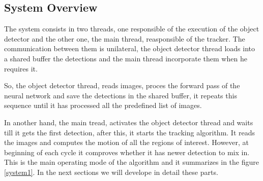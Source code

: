 \documentclass[12pt, a4paper, titlepage,twoside,openright]{article}
\begin{document}
\subsection{System Overview}


The system consists in two threads, one responsible of the execution of the object detector and the other one, the main thread, reasponsible of the tracker. The communication between them is unilateral, the object detector thread loads into a shared buffer the detections and the main thread incorporate them when he requires it.

So, the object detector thread, reads images, proces the forward pass of the neural network and save the detections in the shared buffer, it repeats this sequence until it has processed all the predefined list of images.

In another hand, the main tread, activates the object detector thread and waits till it gets the first detection, after this, it starts the tracking algorithm. It reads the images and computes the motion of all the regions of interest. However, at beginning of each cycle it comproves whether it has newer detection to mix in. This is the main operating mode of the algorithm and it summarizes in the figure \ref{system1}. In the next sections we will develope in detail these parts. 
\end{document}
